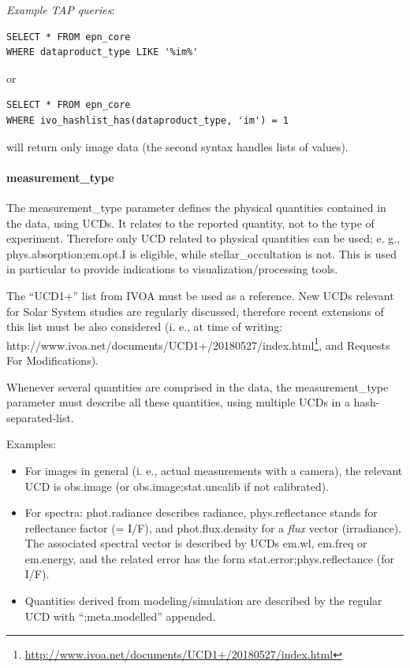 \documentclass[11pt,a4paper]{ivoa}
\begin{document}
\emph{Example TAP queries}:

\begin{verbatim}
SELECT * FROM epn_core 
WHERE dataproduct_type LIKE '%im%'
\end{verbatim}

or 

\begin{verbatim}
SELECT * FROM epn_core 
WHERE ivo_hashlist_has(dataproduct_type, 'im') = 1
\end{verbatim}

will return only image data (the second syntax handles lists of values).

\paragraph{measurement\_type}

The measurement\_type parameter defines the physical quantities contained in the data, using UCDs. It relates to the reported quantity, not to the type of experiment. Therefore only UCD related to physical quantities can be used; e. g., phys.absorption;em.opt.I is eligible, while stellar\_occultation is not. This is used in particular to provide indications to visualization/processing tools.

The ``UCD1+'' list from IVOA must be used as a reference. New UCDs relevant for Solar System studies are regularly discussed, therefore recent extensions of this list must be also considered (i. e., at time of writing: http://www.ivoa.net/documents/UCD1+/20180527/index.html\footnote{\url{http://www.ivoa.net/documents/UCD1+/20180527/index.html}}, and Requests For Modifications). 

Whenever several quantities are comprised in the data, the measurement\_type parameter must describe all these quantities, using multiple UCDs in a hash-separated-list. 

Examples:

\begin{itemize}
\item For images in general (i. e., actual measurements with a camera), the relevant UCD is obs.image (or obs.image;stat.uncalib if not calibrated).
\item For spectra: phot.radiance describes radiance, phys.reflectance stands for reflectance factor (= I/F), and phot.flux.density for a \emph{flux} vector (irradiance). The associated spectral vector is described by UCDs em.wl, em.freq or em.energy, and the related error has the form stat.error;phys.reflectance (for I/F).
\item Quantities derived from modeling/simulation are described by the regular UCD with ``;meta.modelled'' appended. 
\end{itemize}
\end{document}
